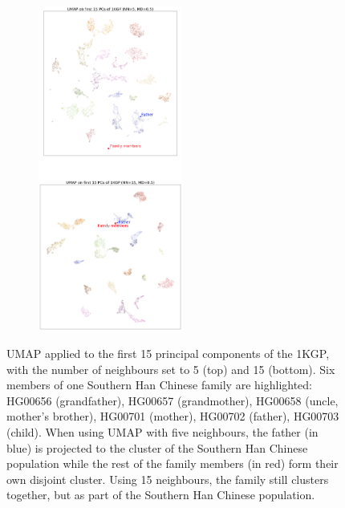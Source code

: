 \documentclass[12pt]{pnas-new}
\begin{document}
\begin{figure}
    \centering
    \begin{subfigure}{\textwidth}
    \includegraphics[width=0.52\textwidth]{images/1KGP_UMAP_PC15_families.png}
    \end{subfigure}
    \caption{UMAP applied to the first 15 principal components of the 1KGP, with the number of neighbours set to 5 (top) and 15 (bottom). Six members of one Southern Han Chinese family are highlighted: HG00656 (grandfather), HG00657 (grandmother), HG00658 (uncle, mother's brother), HG00701 (mother), HG00702 (father), HG00703 (child). When using UMAP with five neighbours, the father (in blue) is projected to the cluster of the Southern Han Chinese population while the rest of the family members (in red) form their own disjoint cluster. Using 15 neighbours, the family still clusters together, but as part of the Southern Han Chinese population.}
    \label{fig:supp_1kgp_families}
\end{figure}
\end{document}
